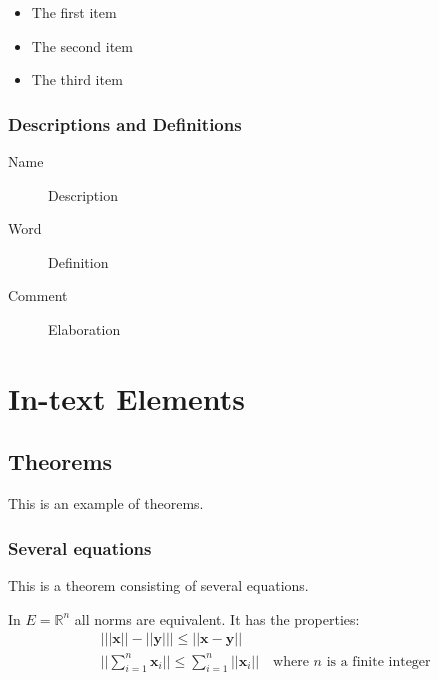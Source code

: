 \documentclass[11pt,fleqn]{book}
\begin{document}
\begin{itemize}
\item The first item
\item The second item
\item The third item
\end{itemize}

\subsection{Descriptions and Definitions}

\begin{description}
\item[Name] Description
\item[Word] Definition
\item[Comment] Elaboration
\end{description}


\chapter{In-text Elements}

\section{Theorems}

This is an example of theorems.

\subsection{Several equations}
This is a theorem consisting of several equations.

\begin{theorem}
In $E=\mathbb{R}^n$ all norms are equivalent. It has the properties:
\begin{align}
& \big| ||\mathbf{x}|| - ||\mathbf{y}|| \big|\leq || \mathbf{x}- \mathbf{y}||\\
&  ||\sum_{i=1}^n\mathbf{x}_i||\leq \sum_{i=1}^n||\mathbf{x}_i||\quad\text{where $n$ is a finite integer}
\end{align}
\end{theorem}
\end{document}
